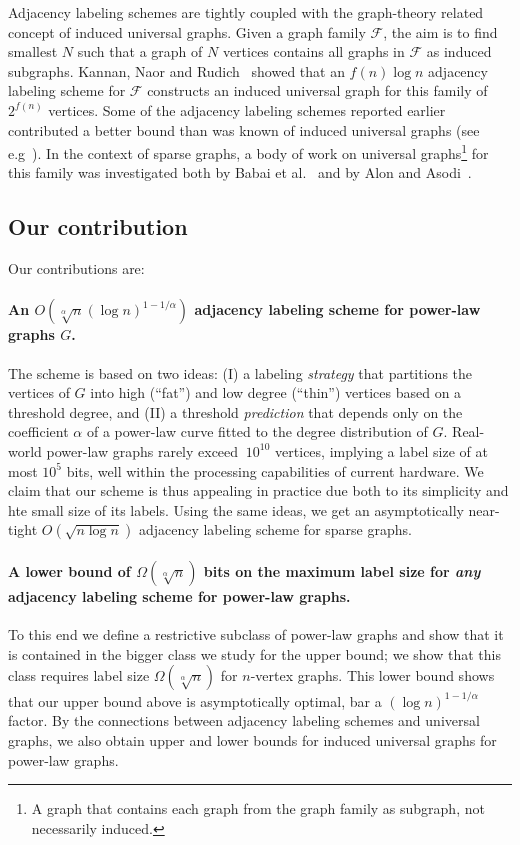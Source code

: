 \documentclass{article}
\theoremstyle{remark}
\begin{document}
Adjacency labeling schemes are tightly coupled with  the graph-theory related concept of induced universal graphs.
Given a  graph family  $\mathcal{F}$, the aim  is to find smallest $N$ such that a graph of  $N$ vertices contains all graphs in $\mathcal{F}$ as induced subgraphs. 
Kannan, Naor and Rudich~\cite{Kannan92} showed that an $f(n) \log n$ adjacency labeling scheme for $\mathcal{F}$  constructs an induced universal graph for this family of  $2^{f(n)}$ vertices. Some  of the adjacency labeling schemes reported earlier  contributed a better bound than was known of  induced universal graphs (see e.g~\cite{BCLR,Alstrup02}).
In the context of  sparse graphs,  a body of work on universal graphs\footnote{A graph that  contains each graph from the graph family as subgraph, not necessarily induced.} for this family was  investigated both by  Babai et al.~\cite{babai1982graphs} and  by Alon and Asodi~\cite{Alon2002universal}. 


\subsection{Our contribution}

Our contributions are:

\paragraph{An  $O(\sqrt[\alpha] n (\log n)^{1 - 1/\alpha})$ adjacency labeling scheme for power-law graphs $G$.}
The scheme is based on two ideas:
(I) a labeling \emph{strategy} that  partitions the vertices of $G$ into high (``fat'') and low degree (``thin'') vertices based on a threshold degree, and (II) a threshold \emph{prediction} that depends only on the coefficient $\alpha$ of a power-law curve fitted to the degree distribution of $G$. 
Real-world power-law graphs rarely exceed  $~10^{10}$ vertices, implying a label size of at most  ${10^{5}}$ bits, well within the processing capabilities of current hardware. 
We claim that our  scheme is thus appealing in practice   due both to  its simplicity and hte small size of its labels.
Using the same ideas, we get an  asymptotically near-tight  $O(\sqrt{n \log n})$ adjacency labeling scheme for sparse graphs.


\paragraph{A lower bound of $\Omega(\sqrt[\alpha]{n})$ bits on the maximum label size for \emph{any} adjacency labeling scheme for power-law graphs.}
To this end we define a  restrictive subclass of power-law graphs and show that it is contained in the bigger class we study for the upper bound; we show that this class requires label size $\Omega(\sqrt[\alpha]{n})$ for $n$-vertex graphs.
This lower bound shows that our upper bound above is asymptotically  optimal, bar a $(\log n)^{1 - 1/\alpha}$ factor.
By the connections between adjacency labeling schemes and universal graphs, we also obtain upper and lower bounds for induced universal graphs for power-law graphs. 
\end{document}
